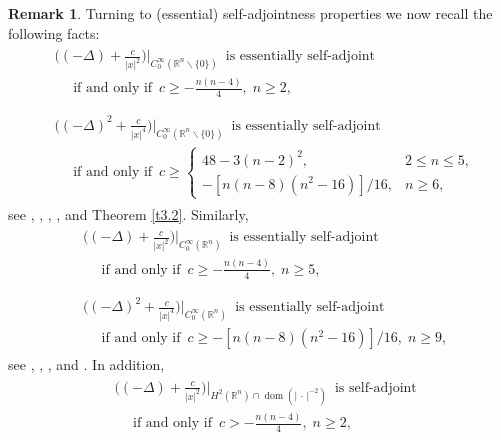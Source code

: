 \documentclass[reqno,11pt,centertags]{amsart}
\newcommand{\bbR}{{\mathbb{R}}}
\newcommand{\<}{\langle}
\renewcommand{\>}{\rangle}
\newcommand{\lb}{\label}
\newcommand{\f}{\frac}
\newcommand{\dott}{\,\cdot\,}
\newcommand{\dom}{\operatorname{dom}}
\numberwithin{equation}{section}
\theoremstyle{definition}
\newtheorem{remark}[theorem]{Remark}
\begin{document}
\begin{remark}
Turning to (essential) self-adjointness properties we now recall the following facts:
\begin{align}
\begin{split} 
& \bigg((-\Delta) + \f{c}{|x|^2}\bigg)\bigg|_{C_0^{\infty}(\bbR^n\backslash\{0\})} \, \text{ is essentially self-adjoint}  \lb{3.35} \\
& \quad \text{ if and only if } \, c \geq - \f{n(n-4)}{4}, \; n \geq 2,   \\
\end{split} \\
\begin{split}
& \bigg((-\Delta)^2 + \f{c}{|x|^4}\bigg)\bigg|_{C_0^{\infty}(\bbR^n\backslash\{0\})} \, \text{ is essentially self-adjoint} \\
& \quad \text{ if and only if } \, c \geq \begin{cases} 48 - 3 (n-2)^2, & 2\leq n \leq 5, \\
- [n(n-8)(n^2-16)]/16, & n \geq 6,    
\end{cases}    \lb{3.36} 
\end{split}
\end{align}
see \cite[Theorem~7.4.2]{EE18}, \cite{KSWW75}, \cite{KW72}, \cite{Sc72}, \cite{Si73} and Theorem \ref{t3.2}. Similarly,
\begin{align}
\begin{split} 
& \bigg((-\Delta) + \f{c}{|x|^2}\bigg)\bigg|_{C_0^{\infty}(\bbR^n)} \, \text{ is essentially self-adjoint}    \lb{3.37} \\
& \quad \text{ if and only if } \, c \geq - \f{n(n-4)}{4}, \; n \geq 5,    \\
\end{split} \\
\begin{split}
& \bigg((-\Delta)^2 + \f{c}{|x|^4}\bigg)\bigg|_{C_0^{\infty}(\bbR^n)} \, \text{ is essentially self-adjoint}    \lb{3.38} \\
& \quad \text{ if and only if } \, c \geq - [n(n-8)(n^2-16)]/16, \; n \geq 9,    
\end{split}
\end{align}
see  \cite[Proposition~7.4.1]{EE18}, \cite{KSWW75}, \cite{OTY11}, and \cite{Ta10}. In addition,
\begin{align}
\begin{split} 
& \bigg((-\Delta) + \f{c}{|x|^2}\bigg)\bigg|_{H^2(\bbR^n)\cap\dom(|\dott|^{-2})} \, \text{ is self-adjoint}    \lb{3.39} \\
& \quad \text{ if and only if } \, c > - \f{n(n-4)}{4}, \; n \geq 2,    \\

\end{split}
\end{align}
\end{remark}
\end{document}

